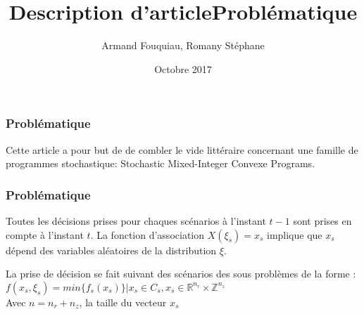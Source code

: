 \documentclass[10pt]{beamer}
\title{Description d'article}
\author{Armand Fouquiau, Romany Stéphane}
\institute{Université Paris-Sud}
\date{Octobre 2017}
\newcommand{\reels}{\mathbb{R}}
\newcommand{\integers}{\mathbb{Z}}
\begin{document}
    \begin{frame}
    \titlepage
    \end{frame}

    
        \begin{frame}
        \frametitle{Problématique}
        Cette article a pour but de de combler le vide littéraire concernant une famille de programmes stochastique: Stochastic Mixed-Integer Convexe Programs.
    \end{frame}
        
    \begin{frame}
        \frametitle{Problématique}
        Toutes les décisions prises pour chaques scénarios à l'instant $t-1$ sont prises en compte à l'instant $t$. La fonction d'association $X(\xi_s) = x_s$ implique que $x_s$ dépend des variables aléatoires de la distribution $\xi$.
    \end{frame}
    
    
    \begin{frame}
        \title{Problématique}
        La prise de décision se fait suivant des scénarios des sous problèmes de la forme : 
         $f(x_s, \xi_{s}) = min \{f_s(x_s)\} | x_s \in C_s, x_s \in \reels^{n_r} \times \integers^{n_z}$\\
         Avec $n = n_r + n_z$, la taille du vecteur $x_s$
    \end{frame}
    
    \iffalse
    \begin{frame}
        \frametitle{Problématique}
        
    \end{frame}
        
    \begin{frame}
        \frametitle{Etat de l'art}
        
    \end{frame}
        
    \begin{frame}
        \frametitle{Approches/Méthodes Etudiées}
    \end{frame}
                
    \begin{frame}
        \frametitle{Master-Worker Parallel with Barrier}            
    \end{frame}
        
    \begin{frame}
        \frametitle{Résultat}
    \end{frame}
        
    \begin{frame}
        \frametitle{Conclusion/Perspective}
    \end{frame}

    \fi
\end{document}
